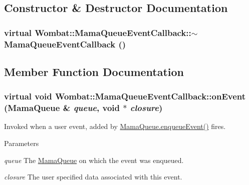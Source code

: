 \subsection{Constructor \& Destructor Documentation}
\hypertarget{classWombat_1_1MamaQueueEventCallback_acfe9bf6b75e5c77972529963517eee8b}{
\subsubsection[{$\sim$MamaQueueEventCallback}]{\setlength{\rightskip}{0pt plus 5cm}virtual Wombat::MamaQueueEventCallback::$\sim$MamaQueueEventCallback ()}}
\label{classWombat_1_1MamaQueueEventCallback_acfe9bf6b75e5c77972529963517eee8b}


\subsection{Member Function Documentation}
\hypertarget{classWombat_1_1MamaQueueEventCallback_ae5d78bf4717b97e7d72858a30e2a3233}{
\subsubsection[{onEvent}]{\setlength{\rightskip}{0pt plus 5cm}virtual void Wombat::MamaQueueEventCallback::onEvent ({\bf MamaQueue} \& {\em queue}, \/  void $\ast$ {\em closure})}}
\label{classWombat_1_1MamaQueueEventCallback_ae5d78bf4717b97e7d72858a30e2a3233}


Invoked when a user event, added by {\ttfamily \hyperlink{classWombat_1_1MamaQueue_a8b1a038741f3d3c5cd3bcea8708003c7}{MamaQueue.enqueueEvent()}} fires. 
\begin{DoxyParams}{Parameters}
\item[{\em queue}]The \hyperlink{classWombat_1_1MamaQueue}{MamaQueue} on which the event was enqueued. \item[{\em closure}]The user specified data associated with this event. \end{DoxyParams}
